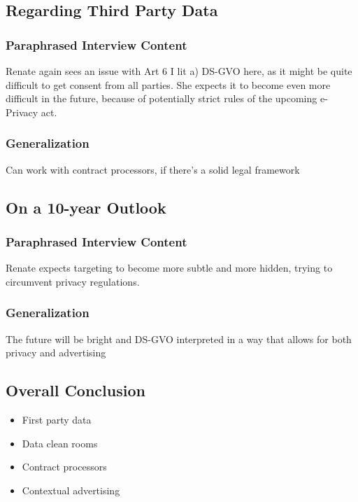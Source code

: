 \subsection{Regarding Third Party Data}

\subsubsection{Paraphrased Interview Content}

Renate again sees an issue with Art 6 I lit a) DS-GVO here, as it might be quite difficult to get consent from all parties. She expects it to become even more difficult in the future, because of potentially strict rules of the upcoming e-Privacy act.

\subsubsection{Generalization}

Can work with contract processors, if there's a solid legal framework

\subsection{On a 10-year Outlook}

\subsubsection{Paraphrased Interview Content}

Renate expects targeting to become more subtle and more hidden, trying to circumvent privacy regulations.

\subsubsection{Generalization}

The future will be bright and DS-GVO interpreted in a way that allows for both privacy and advertising

\subsection{Overall Conclusion}

\begin{itemize}
 \item First party data 
 \item Data clean rooms
 \item Contract processors
 \item Contextual advertising
\end{itemize}
